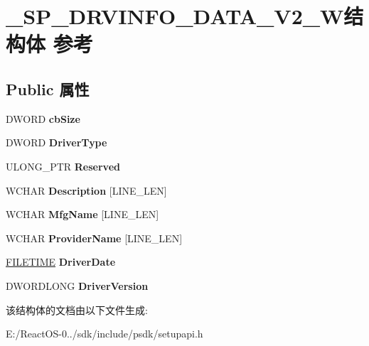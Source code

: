 \hypertarget{struct___s_p___d_r_v_i_n_f_o___d_a_t_a___v2___w}{}\section{\+\_\+\+S\+P\+\_\+\+D\+R\+V\+I\+N\+F\+O\+\_\+\+D\+A\+T\+A\+\_\+\+V2\+\_\+\+W结构体 参考}
\label{struct___s_p___d_r_v_i_n_f_o___d_a_t_a___v2___w}
\subsection*{Public 属性}
\begin{DoxyCompactItemize}
\item 
\mbox{\label{struct___s_p___d_r_v_i_n_f_o___d_a_t_a___v2___w_a8bc6855748f07be4d7398c6fdc2629ea}} 
D\+W\+O\+RD {\bfseries cb\+Size}
\item 
\mbox{\label{struct___s_p___d_r_v_i_n_f_o___d_a_t_a___v2___w_a3fbcf501fc256961652464d84aa26745}} 
D\+W\+O\+RD {\bfseries Driver\+Type}
\item 
\mbox{\label{struct___s_p___d_r_v_i_n_f_o___d_a_t_a___v2___w_ac35655e73fe422fb082ace825b4a9acb}} 
U\+L\+O\+N\+G\+\_\+\+P\+TR {\bfseries Reserved}
\item 
\mbox{\label{struct___s_p___d_r_v_i_n_f_o___d_a_t_a___v2___w_ade2c6f592760722a21c20f97e3789d30}} 
W\+C\+H\+AR {\bfseries Description} \mbox{[}L\+I\+N\+E\+\_\+\+L\+EN\mbox{]}
\item 
\mbox{\label{struct___s_p___d_r_v_i_n_f_o___d_a_t_a___v2___w_a33a908121312ee79d2a8396cc6c7b561}} 
W\+C\+H\+AR {\bfseries Mfg\+Name} \mbox{[}L\+I\+N\+E\+\_\+\+L\+EN\mbox{]}
\item 
\mbox{\label{struct___s_p___d_r_v_i_n_f_o___d_a_t_a___v2___w_a1c85f2ed0fb95bdda39eb28af779775b}} 
W\+C\+H\+AR {\bfseries Provider\+Name} \mbox{[}L\+I\+N\+E\+\_\+\+L\+EN\mbox{]}
\item 
\mbox{\label{struct___s_p___d_r_v_i_n_f_o___d_a_t_a___v2___w_ac218acf78d50a0443336dde6ca0c7afb}} 
\hyperlink{struct___f_i_l_e_t_i_m_e}{F\+I\+L\+E\+T\+I\+ME} {\bfseries Driver\+Date}
\item 
\mbox{\label{struct___s_p___d_r_v_i_n_f_o___d_a_t_a___v2___w_a7355a62645d9ecb9fbce3eab168cb63b}} 
D\+W\+O\+R\+D\+L\+O\+NG {\bfseries Driver\+Version}
\end{DoxyCompactItemize}


该结构体的文档由以下文件生成\+:\begin{DoxyCompactItemize}
\item 
E\+:/\+React\+O\+S-\/0../sdk/include/psdk/setupapi.\+h\end{DoxyCompactItemize}
